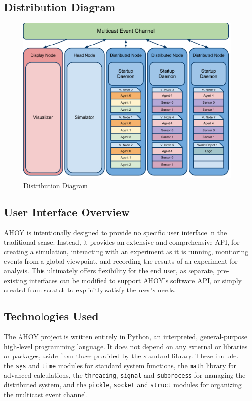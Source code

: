 \documentclass[titlepage]{article}
\begin{document}
\subsection{Distribution Diagram}
\begin{figure}%
    \centering
    \includegraphics[scale=.6]{../initial-pres/arch.pdf}
    \caption{Distribution Diagram}
    \label{fig-distribution}
\end{figure}

\subsection{User Interface Overview}
AHOY is intentionally designed to provide no specific user interface in the traditional sense. Instead, it provides an extensive and comprehensive API, for creating a simulation, interacting with an experiment as it is running, monitoring events from a global viewpoint, and recording the results of an experiment for analysis. This ultimately offers flexibility for the end user, as separate, pre-existing interfaces can be modified to support AHOY's software API, or simply created from scratch to explicitly satisfy the user's needs. 

\subsection{Technologies Used}
The AHOY project is written entirely in Python, an interpreted, general-purpose high-level programming language. It does not depend on any external or libraries or packages, aside from those provided by the standard library. These include: the \texttt{sys} and \texttt{time} modules for standard system functions, the \texttt{math} library for advanced calculations, the \texttt{threading}, \texttt{signal} and \texttt{subprocess} for managing the distributed system, and the \texttt{pickle}, \texttt{socket} and \texttt{struct} modules for organizing the multicast event channel.
\end{document}
